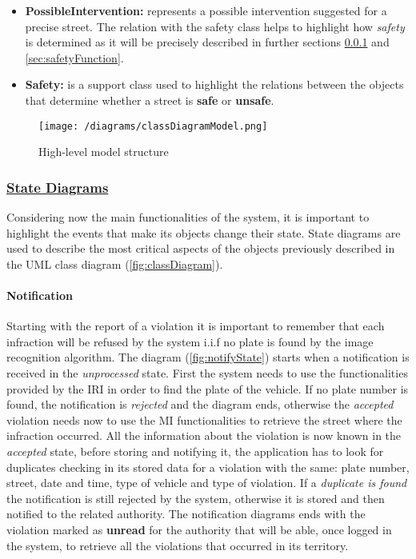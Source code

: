 \begin{itemize}
		\item \textbf{PossibleIntervention:} represents a possible intervention suggested for a precise street. The relation with the safety class helps to highlight how \emph{safety} is determined as it will be precisely described in further sections \ref{sec:stateDiagrams} and \ref{sec:safetyFunction}.
		
		\item \textbf{Safety:} is a support class used to highlight the relations between the objects that determine whether a street is \textbf{safe} or \textbf{unsafe}.
	\end{itemize}
	
	\begin{figure}[h!]
		\centering
		\texttt{[image: /diagrams/classDiagramModel.png]}
		\caption{\label{fig:classDiagram}High-level model structure}
	\end{figure}

	\FloatBarrier
	
	\subsubsection[State Diagrams]{\hyperlink{toc}{State Diagrams}}
	\label{sec:stateDiagrams}
		Considering now the main functionalities of the system, it is important to highlight the events that make its objects change their state. State diagrams are used to describe the most critical aspects of the objects previously described in the UML class diagram (\autoref{fig:classDiagram}).
		
		\paragraph{Notification}
			Starting with the report of a violation it is important to remember that each infraction will be refused by the system i.i.f no plate is found by the image recognition algorithm. The diagram (\autoref{fig:notifyState}) starts when a notification is received in the \textit{unprocessed} state. First the system needs to use the functionalities provided by the IRI in order to find the plate of the vehicle. If no plate number is found, the notification is \textit{rejected} and the diagram ends, otherwise the \textit{accepted} violation needs now to use the MI functionalities to retrieve the street where the infraction occurred. All the information about the violation is now known in the \textit{accepted} state, before storing and notifying it, the application has to look for duplicates checking in its stored data for a violation with the same: plate number, street, date and time, type of vehicle and type of violation. If a \textit{duplicate is found} the notification is still rejected by the system, otherwise it is stored and then notified to the related authority. The notification diagrams ends with the violation marked as \textbf{unread} for the authority that will be able, once logged in the system, to retrieve all the violations that occurred in its territory.
			
